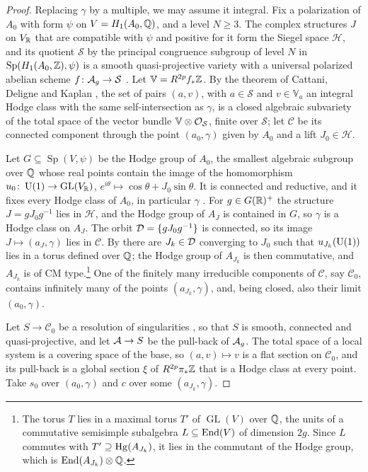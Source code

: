 \begin{proof}
Replacing $\gamma$ by a multiple, we may assume it integral. Fix a
polarization of $A_{0}$ with form $\psi$ on $V=H_{1}(A_{0},\mathbb{Q})$, and a level
$N\ge3$. The complex structures $J$ on $V_{\mathbb{R}}$ that are compatible with
$\psi$ and positive for it form the Siegel space $\mathcal{H}$, and its
quotient $\mathcal{S}$ by the principal congruence subgroup of level $N$ in
$\operatorname{Sp}(H_{1}(A_{0},\mathbb{Z}),\psi)$ is a smooth quasi-projective
variety with a universal polarized abelian scheme $f\colon\mathcal{A}_{g}\to
\mathcal{S}$ \cite[Chapter~7]{MFK94}. Let $\mathbb{V}=R^{2p}f_{*}\mathbb{Z}$. By
the theorem of Cattani, Deligne and Kaplan \cite[Theorem~1.1]{CDK95}, the
set of pairs $(a,v)$, with $a\in\mathcal{S}$ and $v\in\mathbb{V}_{a}$ an
integral Hodge class with the same self-intersection as $\gamma$, is a closed
algebraic subvariety of the total space of the vector bundle
$\mathbb{V}\otimes\mathcal{O}_{\mathcal{S}}$, finite over $\mathcal{S}$; let
$\mathcal{C}$ be its connected component through the point $(a_{0},\gamma)$
given by $A_{0}$ and a lift $J_{0}\in\mathcal{H}$.

Let $G\subseteq\operatorname{Sp}(V,\psi)$ be the Hodge group of $A_{0}$, the
smallest algebraic subgroup over $\mathbb{Q}$ whose real points contain the image
of the homomorphism $u_{0}\colon\operatorname{U}(1)\to\operatorname{GL}(V_{\mathbb{R}})$,
$e^{i\theta}\mapsto\cos\theta+J_{0}\sin\theta$. It is connected and
reductive, and it fixes every Hodge class of $A_{0}$, in particular $\gamma$
\cite[\S3]{Del82}. For $g\in G(\mathbb{R})^{+}$ the structure $J=gJ_{0}g^{-1}$ lies
in $\mathcal{H}$, and the Hodge group of $A_{J}$ is contained in $G$, so
$\gamma$ is a Hodge class on $A_{J}$. The orbit $\mathcal{D}=\{gJ_{0}g^{-1}\}$ is
connected, so its image $J\mapsto(a_{J},\gamma)$ lies in $\mathcal{C}$. By
 there are $J_{k}\in\mathcal{D}$ converging to $J_{0}$ such that
$u_{J_{k}}(\operatorname{U}(1))$ lies in a torus defined over $\mathbb{Q}$; the Hodge group of
$A_{J_{k}}$ is then commutative, and $A_{J_{k}}$ is of CM
type.\footnote{The torus $T$ lies in a maximal torus $T'$ of
$\operatorname{GL}(V)$ over $\mathbb{Q}$, the units of a commutative semisimple
subalgebra $L\subseteq\operatorname{End}(V)$ of dimension $2g$. Since $L$ commutes with
$T'\supseteq\operatorname{Hg}(A_{J_{k}})$, it lies in the commutant of the Hodge group,
which is $\operatorname{End}(A_{J_{k}})\otimes\mathbb{Q}$.} One of the finitely many irreducible
components of $\mathcal{C}$, say $\mathcal{C}_{0}$, contains infinitely many
of the points $(a_{J_{k}},\gamma)$, and, being closed, also their limit
$(a_{0},\gamma)$.

Let $S\to\mathcal{C}_{0}$ be a resolution of singularities \cite{Hir64}, so
that $S$ is smooth, connected and quasi-projective, and let $\mathcal{A}\to S$ be the
pull-back of $\mathcal{A}_{g}$. The total space of a local system is a covering space
of the base, so $(a,v)\mapsto v$ is a flat section on $\mathcal{C}_{0}$, and
its pull-back is a global section $\xi$ of $R^{2p}\pi_{*}\mathbb{Z}$ that is a Hodge
class at every point. Take $s_{0}$ over $(a_{0},\gamma)$ and $c$ over some
$(a_{J_{k}},\gamma)$.
\end{proof}


